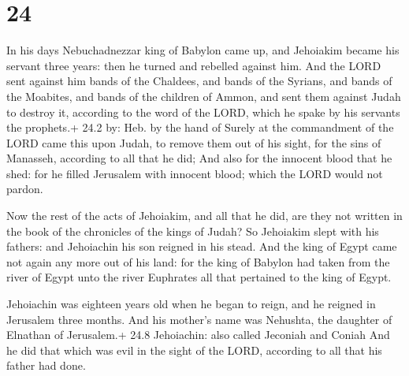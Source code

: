 \hypertarget{section-23}{%
\section{24}\label{section-23}}

 In his days Nebuchadnezzar king of Babylon came up, and
Jehoiakim became his servant three years: then he turned and rebelled
against him.  And the LORD sent against him bands of the
Chaldees, and bands of the Syrians, and bands of the Moabites, and bands
of the children of Ammon, and sent them against Judah to destroy it,
according to the word of the LORD, which he spake by his servants the
prophets.+ 24.2 by: Heb. by the hand of  Surely at the
commandment of the LORD came this upon Judah, to remove them out of his
sight, for the sins of Manasseh, according to all that he did;
 And also for the innocent blood that he shed: for he filled
Jerusalem with innocent blood; which the LORD would not pardon.

 Now the rest of the acts of Jehoiakim, and all that he
did, are they not written in the book of the chronicles of the kings of
Judah?  So Jehoiakim slept with his fathers: and Jehoiachin
his son reigned in his stead.  And the king of Egypt came
not again any more out of his land: for the king of Babylon had taken
from the river of Egypt unto the river Euphrates all that pertained to
the king of Egypt.

 Jehoiachin was eighteen years old when he began to reign,
and he reigned in Jerusalem three months. And his mother's name was
Nehushta, the daughter of Elnathan of Jerusalem.+ 24.8 Jehoiachin: also
called Jeconiah and Coniah  And he did that which was evil
in the sight of the LORD, according to all that his father had done.

